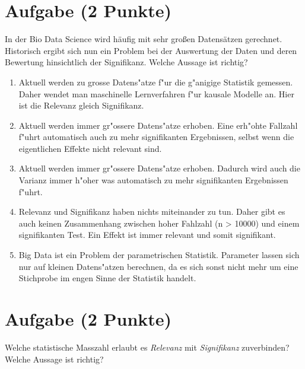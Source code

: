 \documentclass[a4paper, 10pt]{scrartcl}\usepackage[]{graphicx}\usepackage[]{xcolor}
\begin{document}
\section{Aufgabe \hfill (2 Punkte)}

In der Bio Data Science wird h{\"a}ufig mit sehr gro{\ss}en Datens{\"a}tzen
gerechnet. Historisch ergibt sich nun ein Problem bei der Auswertung der
Daten und deren Bewertung hinsichtlich der Signifikanz. Welche Aussage ist richtig?



\begin{enumerate}
\item [\textbf{A} \msquare] Aktuell werden zu grosse Datens{"a}tze f{"u}r die g{"a}nigige Statistik gemessen. Daher wendet man maschinelle Lernverfahren f{"u}r kausale Modelle an. Hier ist die Relevanz gleich Signifikanz.
\item [\textbf{B} \msquare] Aktuell werden immer gr{"o}ssere Datens{"a}tze erhoben. Eine erh{"o}hte Fallzahl f{"u}hrt automatisch auch zu mehr signifikanten Ergebnissen, selbst wenn die eigentlichen Effekte nicht relevant sind.
\item [\textbf{C} \msquare] Aktuell werden immer gr{"o}ssere Datens{"a}tze erhoben. Dadurch wird auch die Varianz immer h{"o}her was automatisch zu mehr signifikanten Ergebnissen f{"u}hrt.
\item [\textbf{D} \msquare] Relevanz und Signifikanz haben nichts miteinander zu tun. Daher gibt es auch keinen Zusammenhang zwischen hoher Fahlzahl (n > 10000) und einem signifikanten Test. Ein Effekt ist immer relevant und somit signifikant.
\item [\textbf{E} \msquare] Big Data ist ein Problem der parametrischen Statistik. Parameter lassen sich nur auf kleinen Datens{"a}tzen berechnen, da es sich sonst nicht mehr um eine Stichprobe im engen Sinne der Statistik handelt.
\end{enumerate}

\section{Aufgabe \hfill (2 Punkte)}

Welche statistische Masszahl erlaubt es \textit{Relevanz} mit
\textit{Signifikanz} zuverbinden? Welche Aussage ist richtig?
\end{document}

